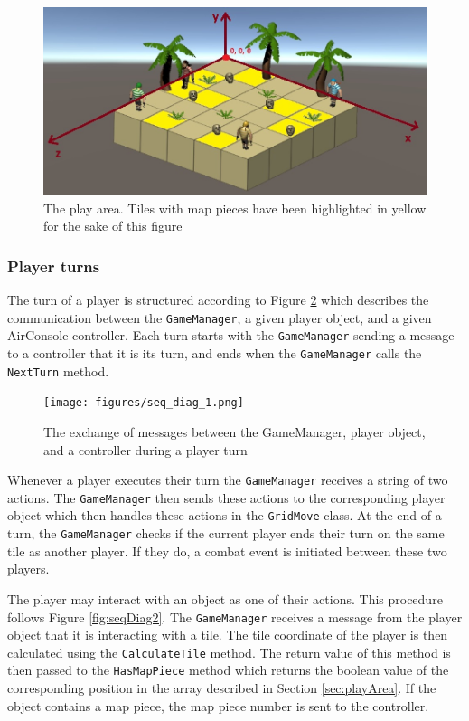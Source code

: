 \begin{figure}
	\centering
	\includegraphics[width=1\textwidth]{figures/mapFigure.jpg}
	\caption{The play area. Tiles with map pieces have been highlighted in yellow for the sake of this figure\label{fig:playArea}}
\end{figure}

\subsubsection{Player turns}\label{sec:playerTurns}
The turn of a player is structured according to Figure \ref{fig:seqDiagram1} which describes the communication between the \texttt{GameManager}, a given player object, and a given AirConsole controller. Each turn starts with the \texttt{GameManager} sending a message to a controller that it is its turn, and ends when the \texttt{GameManager} calls the \texttt{NextTurn} method. 

\begin{figure}
	\centering	
	\texttt{[image: figures/seq\_diag\_1.png]}
	\caption{The exchange of messages between the GameManager, player object, and a controller during a player turn\label{fig:seqDiagram1}}
\end{figure}

Whenever a player executes their turn the \texttt{GameManager} receives a string of two actions. The \texttt{GameManager} then sends these actions to the corresponding player object which then handles these actions in the \texttt{GridMove} class. At the end of a turn, the \texttt{GameManager} checks if the current player ends their turn on the same tile as another player. If they do, a combat event is initiated between these two players.

The player may interact with an object as one of their actions. This procedure follows Figure \ref{fig:seqDiag2}. The \texttt{GameManager} receives a message from the player object that it is interacting with a tile. The tile coordinate of the player is then calculated using the \texttt{CalculateTile} method. The return value of this method is then passed to the \texttt{HasMapPiece} method which returns the boolean value of the corresponding position in the array described in Section \ref{sec:playArea}. If the object contains a map piece, the map piece number is sent to the controller.

